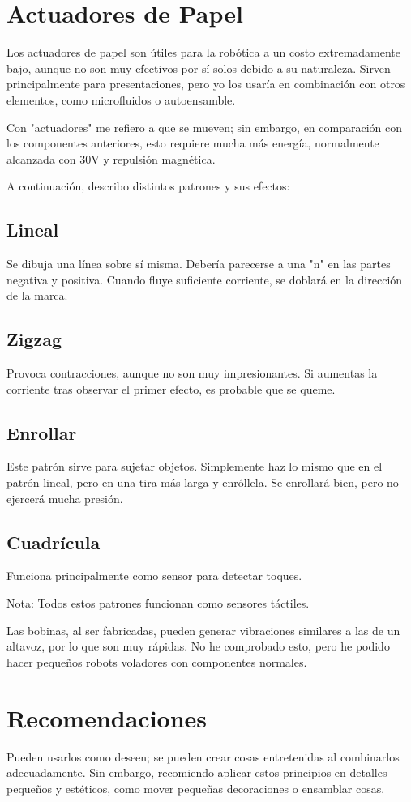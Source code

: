 \documentclass[]{article}
\begin{document}
\section{Actuadores de Papel}
Los actuadores de papel son útiles para la robótica a un costo extremadamente bajo, aunque no son muy efectivos
por sí solos debido a su naturaleza. Sirven principalmente para presentaciones, pero yo los usaría en combinación
 con otros elementos, como microfluidos o autoensamble.

Con "actuadores" me refiero a que se mueven; sin embargo, en comparación con los componentes anteriores, esto requiere
 mucha más energía, normalmente alcanzada con 30V y repulsión magnética.

A continuación, describo distintos patrones y sus efectos:


    \subsection {Lineal} Se dibuja una línea sobre sí misma. Debería parecerse a una "n" en las partes negativa y positiva.
     Cuando fluye suficiente corriente, se doblará en la dirección de la marca.
    \subsection {Zigzag} Provoca contracciones, aunque no son muy impresionantes. Si aumentas la corriente tras observar el
     primer efecto, es probable que se queme.
    \subsection {Enrollar} Este patrón sirve para sujetar objetos. Simplemente haz lo mismo que en el patrón lineal, pero
     en una tira más larga y enróllela. Se enrollará bien, pero no ejercerá mucha presión.
    \subsection {Cuadrícula}Funciona principalmente como sensor para detectar toques.

Nota: Todos estos patrones funcionan como sensores táctiles.

Las bobinas, al ser fabricadas, pueden generar vibraciones similares a las de un altavoz, por lo que son muy rápidas.
 No he comprobado esto, pero he podido hacer pequeños robots voladores con componentes normales.

\section{Recomendaciones}
Pueden usarlos como deseen; se pueden crear cosas entretenidas al combinarlos adecuadamente. Sin embargo, recomiendo 
aplicar estos principios en detalles pequeños y estéticos, como mover pequeñas decoraciones o ensamblar cosas.
\end{document}
